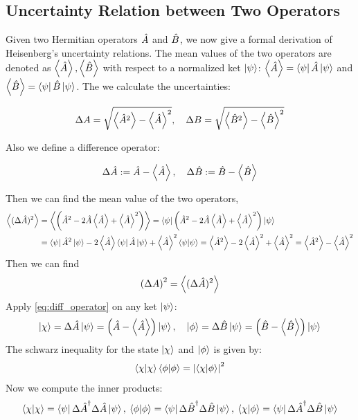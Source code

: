 \subsection{Uncertainty Relation between Two Operators}
Given two Hermitian operators $\hat{A}$ and $\hat{B}$, we now give a formal derivation of Heisenberg's uncertainty relations. The mean values of the two operators are denoted as $\left\langle \hat{A} \right\rangle,\left\langle \hat{B} \right\rangle$ with respect to a normalized ket $\ket{\psi}$: $\left\langle \hat{A} \right\rangle = \bra{\psi} \hat{A} \ket{\psi}$ and $\left\langle \hat{B} \right\rangle = \bra{\psi} \hat{B} \ket{\psi}  $. The we calculate the uncertainties: 
\begin{tcolorbox}
    \begin{eqnarray}
        \Delta A = \sqrt{\left\langle \hat{A}^2 \right\rangle - \left\langle \hat{A} \right\rangle^2}, \quad \Delta B = \sqrt{\left\langle \hat{B}^2 \right\rangle - \left\langle \hat{B} \right\rangle^2}
    \end{eqnarray}
\end{tcolorbox}
Also we define a difference operator: 
\begin{tcolorbox}
    \begin{eqnarray}
        \Delta \hat{A} := \hat{A} - \left\langle \hat{A} \right\rangle, \quad \Delta \hat{B} := \hat{B} - \left\langle \hat{B} \right\rangle \label{eq:diff_operator}
    \end{eqnarray}
\end{tcolorbox}
Then we can find the mean value of the two operators,
\begin{align}
    \left\langle (\Delta\hat{A})^2 \right\rangle &= \left\langle \left( \hat{A}^2 - 2 \hat{A} \left\langle \hat{A} \right\rangle + \left\langle \hat{A} \right\rangle^2 \right) \right\rangle = \bra{\psi} \left( \hat{A}^2 - 2 \hat{A} \left\langle \hat{A} \right\rangle + \left\langle \hat{A} \right\rangle^2 \right) \ket{\psi} \\
    &= \bra{\psi} \hat{A}^2 \ket{\psi} - 2\left\langle \hat{A} \right\rangle \bra{\psi} \hat{A} \ket{\psi} + \left\langle \hat{A} \right\rangle^2 \braket{\psi|\psi} = \left\langle \hat{A}^2 \right\rangle -2 \left\langle \hat{A} \right\rangle^2 + \left\langle \hat{A} \right\rangle^2 = \left\langle \hat{A}^2 \right\rangle - \left\langle \hat{A} \right\rangle^2
\end{align}
Then we can find 
\begin{eqnarray}
    \left(\Delta A\right)^2 = \left\langle (\Delta\hat{A})^2 \right\rangle
\end{eqnarray}
Apply \cref{eq:diff_operator} on any ket $\ket{\psi}$: 
\begin{eqnarray}
    \ket{\chi} = \Delta \hat{A} \ket{\psi} = \left(\hat{A} - \left\langle \hat{A} \right\rangle\right) \ket{\psi}, \quad \ket{\phi} = \Delta \hat{B} \ket{\psi} = \left(\hat{B} - \left\langle \hat{B} \right\rangle\right) \ket{\psi}
\end{eqnarray} 
The schwarz inequality for the state $\ket{\chi}$ and $\ket{\phi}$ is given by: 
\begin{eqnarray}
    \braket{\chi|\chi} \braket{\phi|\phi} = \left| \braket{\chi|\phi} \right|^2 
\end{eqnarray}
Now we compute the inner products: 
\begin{eqnarray}
    \braket{\chi|\chi} = \bra{\psi} {\Delta \hat{A}} ^ \dag \Delta \hat{A} \ket{\psi}, \: \braket{\phi|\phi} = \bra{\psi} {\Delta \hat{B}}^ \dag \Delta \hat{B} \ket{\psi}, \: \braket{\chi|\phi} = \bra{\psi} {\Delta \hat{A}}^ \dag \Delta \hat{B} \ket{\psi} \label{eq:inner_uncertainty}
\end{eqnarray}
